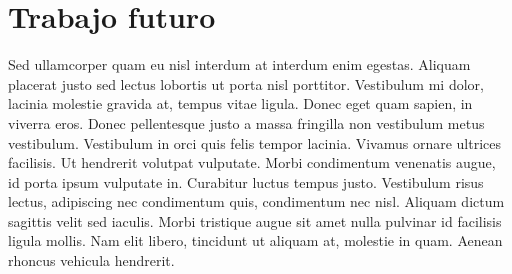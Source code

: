 
\section{Trabajo futuro}

Sed ullamcorper quam eu nisl interdum at interdum enim egestas. Aliquam placerat justo sed lectus lobortis ut porta nisl porttitor. Vestibulum mi dolor, lacinia molestie gravida at, tempus vitae ligula. Donec eget quam sapien, in viverra eros. Donec pellentesque justo a massa fringilla non vestibulum metus vestibulum. Vestibulum in orci quis felis tempor lacinia. Vivamus ornare ultrices facilisis. Ut hendrerit volutpat vulputate. Morbi condimentum venenatis augue, id porta ipsum vulputate in. Curabitur luctus tempus justo. Vestibulum risus lectus, adipiscing nec condimentum quis, condimentum nec nisl. Aliquam dictum sagittis velit sed iaculis. Morbi tristique augue sit amet nulla pulvinar id facilisis ligula mollis. Nam elit libero, tincidunt ut aliquam at, molestie in quam. Aenean rhoncus vehicula hendrerit.